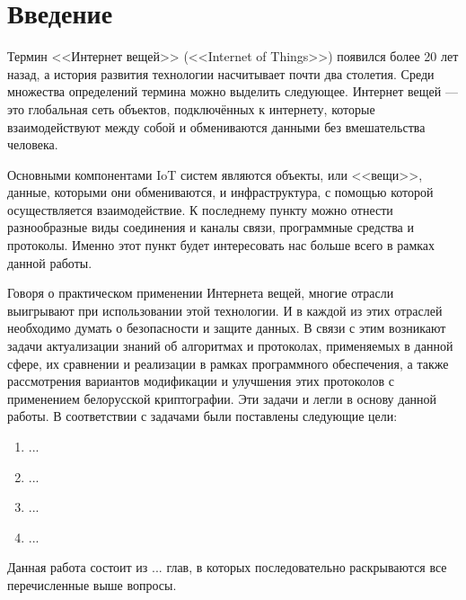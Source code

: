 \chapter*{Введение}
 
 	Термин <<Интернет вещей>> (<<Internet of Things>>) появился более 20 лет назад, а история развития
 	технологии насчитывает почти два столетия. Среди множества определений термина можно выделить
 	следующее. Интернет вещей --- это глобальная сеть объектов, подключённых к интернету, которые 
 	взаимодействуют между собой и обмениваются данными без вмешательства человека.
 	
 	Основными компонентами IoT систем являются объекты, или <<вещи>>, данные, которыми они обмениваются,
 	и инфраструктура, с помощью которой осуществляется взаимодействие. К последнему пункту можно
 	отнести разнообразные виды соединения и каналы связи, программные средства и протоколы. Именно
 	этот пункт будет интересовать нас больше всего в рамках данной работы.
 	
 	Говоря о практическом применении Интернета вещей, многие отрасли выигрывают при использовании
 	этой технологии. И в каждой из этих отраслей необходимо думать о безопасности и защите данных.
 	В связи с этим возникают задачи актуализации знаний об алгоритмах и протоколах, применяемых в
 	данной сфере, их сравнении и реализации в рамках программного обеспечения, а также рассмотрения
 	вариантов модификации и улучшения этих протоколов с применением белорусской криптографии. Эти
 	задачи и легли в основу данной работы. В соответствии с задачами были поставлены следующие цели:
 	
 	\begin{enumerate}
 		\item ...
 		\item ...
 		\item ...
 		\item ...
 	\end{enumerate}
 	
 	Данная работа состоит из ... глав, в которых последовательно раскрываются все 
 	перечисленные выше вопросы.
